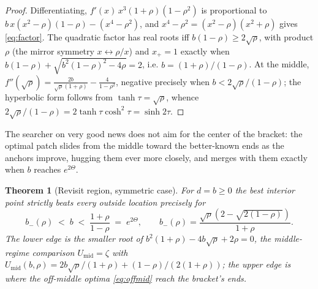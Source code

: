 \documentclass[11pt]{article}
\theoremstyle{itheads}
\newtheorem{theorem}{Theorem}
\begin{document}
\begin{proof}
Differentiating, $f'(x)\,x^{3}\left(1+\rho\right)\left(1-\rho^{2}\right)$
is proportional to
$b\,x\left(x^{2}-\rho\right)\left(1-\rho\right)-\left(x^{4}-\rho^{2}\right)$,
and $x^{4}-\rho^{2}=\left(x^{2}-\rho\right)\left(x^{2}+\rho\right)$
gives \eqref{eq:factor}. The quadratic factor has real roots iff
$b\left(1-\rho\right)\ge 2\sqrt{\rho}$, with product $\rho$ (the
mirror symmetry $x\leftrightarrow\rho/x$) and
$x_{+}=1$ exactly when $b\left(1-\rho\right)+
\sqrt{b^{2}\left(1-\rho\right)^{2}-4\rho}=2$, i.e.
$b=\left(1+\rho\right)/\left(1-\rho\right)$. At the middle,
$f''(\sqrt{\rho}) = \frac{2b}{\sqrt{\rho}\left(1+\rho\right)}
- \frac{4}{1-\rho^{2}}$, negative precisely when
$b<2\sqrt{\rho}/\left(1-\rho\right)$; the hyperbolic form follows
from $\tanh\tau=\sqrt{\rho}$, whence
$2\sqrt{\rho}/\left(1-\rho\right)=2\tanh\tau\cosh^{2}\tau=\sinh 2\tau$.
\end{proof}

The searcher on very good news does not aim for the center of the
bracket: the optimal patch slides from the middle toward the
better-known ends as the anchors improve, hugging them ever more
closely, and merges with them exactly when $b$ reaches $e^{2\Theta}$.

\begin{theorem}[Revisit region, symmetric case]\label{thm:boundary}
For $d=b\ge 0$ the best interior point strictly beats every outside
location precisely for
\begin{equation}\label{eq:region}
b_{-}(\rho) \;<\; b \;<\; \frac{1+\rho}{1-\rho} \;=\; e^{2\Theta},
\qquad
b_{-}(\rho)=\frac{\sqrt{\rho}\left(2-\sqrt{2\left(1-\rho\right)}\right)}{1+\rho}.
\end{equation}
The lower edge is the smaller root of
$b^{2}\left(1+\rho\right)-4b\sqrt{\rho}+2\rho=0$, the middle-regime
comparison $U_{\mathrm{mid}}=\zeta$ with
$U_{\mathrm{mid}}(b,\rho)=2b\sqrt{\rho}/(1+\rho)
+\left(1-\rho\right)/\left(2\left(1+\rho\right)\right)$; the upper
edge is where the off-middle optima \eqref{eq:offmid} reach the
bracket's ends.
\end{theorem}
\end{document}
